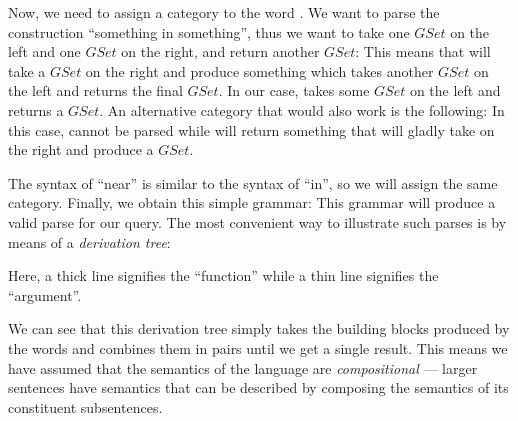 \documentclass[main.tex]{subfiles}
\begin{document}
Now, we need to assign a category to the word . We want to parse
the construction ``something in something'', thus we want to take one $GSet$
on the left and one $GSet$ on the right, and return another $GSet$:
This means that  will take a $GSet$ on the right and produce something
which takes another $GSet$ on the left and returns the final $GSet$.
In our case,  takes some $GSet$ on the left and
returns a $GSet$.
An alternative category that would also work is the following:
In this case,  cannot be parsed while 
will return something that will gladly take  on the right and
produce a $GSet$.

The syntax of ``near'' is similar to the syntax of ``in'', so we will assign
the same category. Finally, we obtain this simple grammar:
This grammar will produce a valid parse for our query.
The most convenient way to illustrate such parses
is by means of a \emph{derivation tree}:

Here, a thick line signifies the ``function'' while a thin line signifies the
``argument''.

We can see that this derivation tree simply takes the building blocks produced
by the words and combines them in pairs until we get a single result. This means
we have assumed that the semantics of the language are \emph{compositional} ---
larger sentences have semantics that can be described by composing the semantics
of its constituent subsentences.
\end{document}
